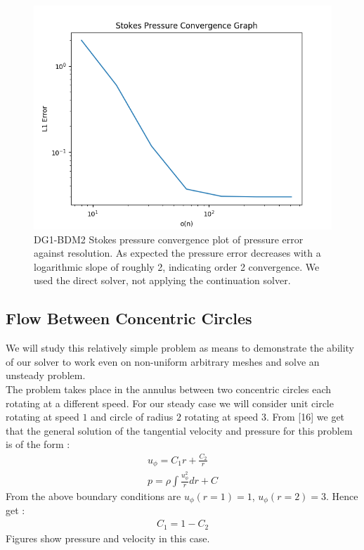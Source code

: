 \documentclass[11pt,twoside,a4paper]{article}
\begin{document}
\begin{figure}
\includegraphics[width=\linewidth]{navier_stokes_pressure_convergence_dbc0.png}
  \caption{DG1-BDM2 Stokes pressure convergence plot of pressure error against resolution. As expected the pressure error decreases with a logarithmic slope of roughly 2, indicating order 2 convergence. We used the direct solver, not applying the continuation solver.}
\end{figure}

\subsection{Flow Between Concentric Circles}

We will study this relatively simple problem as means to demonstrate the ability of our solver to work even on non-uniform arbitrary meshes and solve an unsteady problem.\\
The problem takes place in the annulus between two concentric circles each rotating at a different speed. For our steady case we will consider unit circle rotating at speed $1$ and circle of radius $2$ rotating at speed $3$.
From [16] we get that the general solution of the tangential velocity and pressure for this problem is of the form :
\begin{align}
u_{\phi} = C_1 r + \frac{C_2}{r} \\
p = \rho \int \frac{u_{\phi}^2}{r} dr + C
\end{align}
From the above boundary conditions are $u_{\phi}(r=1) = 1$, $u_{\phi}(r=2) = 3$. Hence get :
\begin{align*}
C_1 = 1 - C_2
\end{align*}
Figures show pressure and velocity in this case.\\
\end{document}
